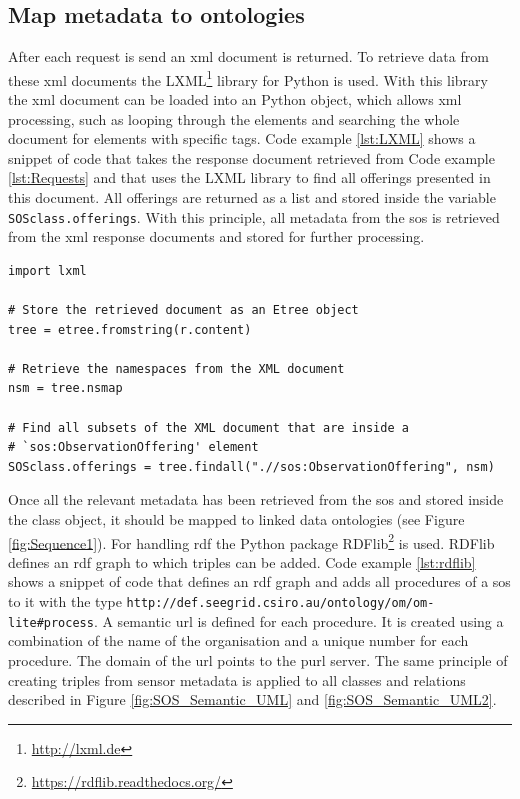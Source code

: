\subsection{Map metadata to ontologies}
After each request is send an \ac{xml} document is returned. To retrieve data from these \ac{xml} documents the LXML\footnote{\url{http://lxml.de}} library for Python is used. With this library the \ac{xml} document can be loaded into an Python object, which allows \ac{xml} processing, such as looping through the elements and searching the whole document for elements with specific tags. Code example \ref{lst:LXML} shows a snippet of code that takes the response document retrieved from Code example \ref{lst:Requests} and that uses the LXML library to find all offerings presented in this document. All offerings are returned as a list and stored inside the variable \texttt{SOSclass.offerings}. With this principle, all metadata from the \ac{sos} is retrieved from the \ac{xml} response documents and stored for further processing.    

\begin{lstlisting}[float,caption={Creating an Etree object from an XML response document using Python's LXML library}, label={lst:LXML}]
import lxml

# Store the retrieved document as an Etree object
tree = etree.fromstring(r.content)

# Retrieve the namespaces from the XML document
nsm = tree.nsmap

# Find all subsets of the XML document that are inside a   
# `sos:ObservationOffering' element 
SOSclass.offerings = tree.findall(".//sos:ObservationOffering", nsm)

\end{lstlisting}   
\begin{sloppypar}
Once all the relevant metadata has been retrieved from the \ac{sos} and stored inside the class object, it should be mapped to linked data ontologies (see Figure \ref{fig:Sequence1}). For handling \ac{rdf} the Python package RDFlib\footnote{\url{https://rdflib.readthedocs.org/}} is used.  RDFlib defines an \ac{rdf} graph to which triples can be added. Code example \ref{lst:rdflib} shows a snippet of code that defines an \ac{rdf} graph and adds all procedures of a \ac{sos} to it with the type \texttt{http://def.seegrid.csiro.au/ontology/om/om-lite\#process}. A semantic \ac{url} is defined for each procedure. It is created using a combination of the name of the organisation and a unique number for each procedure. The domain of the \ac{url} points to the \ac{purl} server. The same principle of creating triples from sensor metadata is applied to all classes and relations described in Figure \ref{fig:SOS_Semantic_UML} and \ref{fig:SOS_Semantic_UML2}. 
\end{sloppypar}


